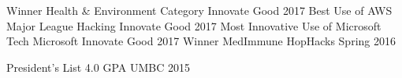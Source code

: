 \begin{cvhonors}
  \cvhonor
    {Winner}
    {Health \& Environment Category}
    {Innovate Good}
    {2017}
  \cvhonor
    {Best Use of AWS}
    {Major League Hacking}
    {Innovate Good}
    {2017}
  \cvhonor
    {Most Innovative Use of Microsoft Tech}
    {Microsoft}
    {Innovate Good}
    {2017}
  \cvhonor
    {Winner}
    {MedImmune}
    {HopHacks Spring}
    {2016}
\end{cvhonors}
\begin{cvhonors}
  \cvhonor
    {President's List}
    {4.0 GPA}
    {UMBC}
    {2015}
\end{cvhonors}
